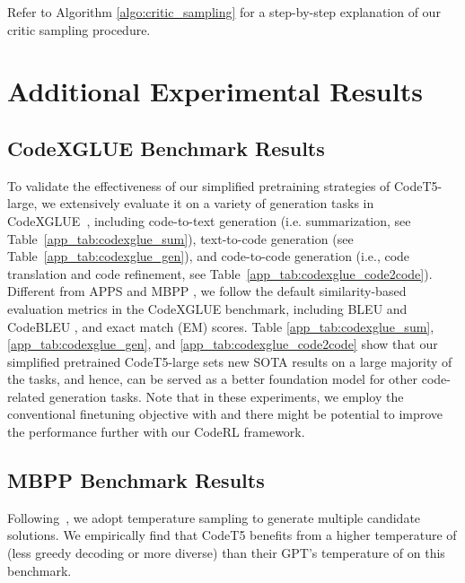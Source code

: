 \documentclass{article}
\begin{document}
Refer to Algorithm \ref{algo:critic_sampling} for a step-by-step explanation of our critic sampling procedure.  

\section{Additional Experimental Results}
\label{app_sec:exps}


\subsection{CodeXGLUE Benchmark Results}
\label{app_sec:codexglue}

To validate the effectiveness of our simplified pretraining strategies of CodeT5-large, we extensively evaluate it on a variety of generation tasks in CodeXGLUE~\citep{codexglue}, including code-to-text generation (i.e. summarization, see Table~\ref{app_tab:codexglue_sum}), text-to-code generation (see Table~\ref{app_tab:codexglue_gen}),  and code-to-code generation (i.e., code translation and code refinement, see Table~\ref{app_tab:codexglue_code2code}). 
Different from APPS \citep{hendrycksapps2021} and MBPP \citep{austin2021program}, we follow the default similarity-based evaluation metrics in the CodeXGLUE benchmark, including BLEU \citep{papineni2002bleu} and CodeBLEU \citep{ren2020codebleu}, and exact match (EM) scores. 
Table \ref{app_tab:codexglue_sum}, \ref{app_tab:codexglue_gen}, and \ref{app_tab:codexglue_code2code} show that our simplified pretrained CodeT5-large sets new SOTA results on a large majority of the tasks, and hence, can be served as a better foundation model for other code-related generation tasks.
Note that in these experiments, 
we employ the conventional finetuning objective with  and there might be potential to improve the performance further with our CodeRL framework. 

\subsection{MBPP Benchmark Results}
\label{app_sec:mbpp_results}

Following~\citet{austin2021program}, we adopt temperature sampling to generate multiple candidate solutions. We empirically find that CodeT5 benefits from
a higher temperature of  (less greedy decoding or more diverse) than their GPT's temperature of  on this benchmark.
 
\end{document}
